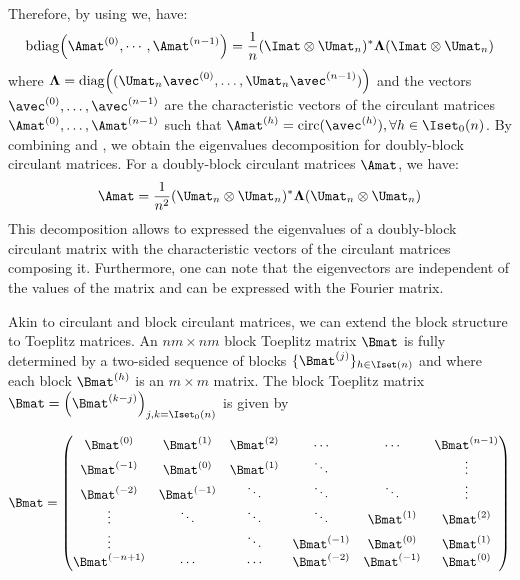 Therefore, by using  we, have:
\begin{equation} \label{equation:ch2-diagonalization_circulant_with_bdiag}
  \bdiag\leftmat \Amat^{(0)}, \cdots, \Amat^{(n-1)} \rightmat = \frac{1}{n} (\Imat \otimes \Umat_n)^* \boldsymbol{\Lambda} (\Imat \otimes \Umat_n)
\end{equation}
where $\boldsymbol{\Lambda} = \diag\left((\Umat_n \avec^{(0)}, \dots, \Umat_n \avec^{(n-1)})\right)$ and the vectors $\avec^{(0)}, \dots, \avec^{(n-1)}$ are the characteristic vectors of the circulant matrices $\Amat^{(0)}, \dots, \Amat^{(n-1)}$ such that $\Amat^{(h)} = \circulant(\avec^{(h)}), \forall h \in \Iset_0(n)$.
By combining  and , we obtain the eigenvalues decomposition for doubly-block circulant matrices.
For a doubly-block circulant matrices $\Amat$, we have:
\begin{equation} \label{equation:ch2-diagonalization_doubly_block_circulant_matrix}
  \Amat = \frac{1}{n^2} (\Umat_n \otimes \Umat_n)^* \boldsymbol{\Lambda} (\Umat_n \otimes \Umat_n) 
\end{equation}
This decomposition allows to expressed the eigenvalues of a doubly-block circulant matrix with the characteristic vectors of the circulant matrices composing it.
Furthermore, one can note that the eigenvectors are independent of the values of the matrix and can be expressed with the Fourier matrix.


Akin to circulant and block circulant matrices, we can extend the block structure to Toeplitz matrices.
An $nm \times nm$ block Toeplitz matrix $\Bmat$ is fully determined by a two-sided sequence of blocks $\{\Bmat^{(j)}\}_{h \in \Iset(n)}$ and where each block $\Bmat^{(h)}$ is an $m \times m$ matrix.
The block Toeplitz matrix $\Bmat = \leftmat\Bmat^{(k-j)} \rightmat_{j,k = \Iset_0(n)}$ is given by

\begin{equation} \label{equation:ch2-block_toeplitz_matrices}
  \Bmat = 
  \leftmatrix
    \Bmat^{(0)}    & \Bmat^{(1)}  & \Bmat^{(2)} & \cdots       & \cdots       & \Bmat^{(n-1)} \\
    \Bmat^{(-1)}   & \Bmat^{(0)}  & \Bmat^{(1)} & \ddots       &              & \vdots        \\
    \Bmat^{(-2)}   & \Bmat^{(-1)} & \ddots      & \ddots       & \ddots       & \vdots        \\ 
    \vdots         & \ddots       & \ddots      & \ddots       & \Bmat^{(1)}  & \Bmat^{(2)}   \\
    \vdots         &              & \ddots      & \Bmat^{(-1)} & \Bmat^{(0)}  & \Bmat^{(1)}   \\
    \Bmat^{(-n+1)} & \cdots       & \cdots      & \Bmat^{(-2)} & \Bmat^{(-1)} & \Bmat^{(0)}
  \rightmatrix
\end{equation}

